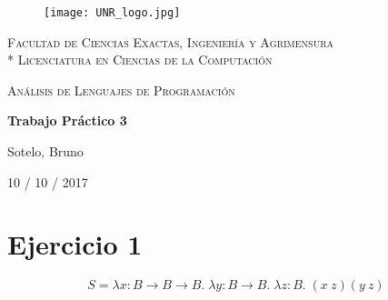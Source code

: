 \documentclass[a4paper]{report}
\begin{document}
\begin{titlepage}
\centering
\begin{figure}[H]
    \begin{center}
        \texttt{[image: UNR\_logo.jpg]}
    \end{center}
\end{figure}
{\scshape\large Facultad de Ciencias Exactas, Ingenier\'ia y Agrimensura\\*
                 Licenciatura en Ciencias de la Computaci\'on\par}
\vspace{3cm}
{\scshape\LARGE An\'alisis de Lenguajes de Programaci\'on \par}
{\huge\bfseries Trabajo Pr\'actico 3 \par}
\vspace{3cm}
{\Large Sotelo, Bruno\par}
\vfill
{\large 10 / 10 / 2017 \par}
\end{titlepage}


\section*{Ejercicio 1}
$$ S = \lambda x:B\rightarrow B\rightarrow B.\; \lambda y:B\rightarrow B.
\; \lambda z:B.\; (x\: z)(y\: z) $$
\end{document}

